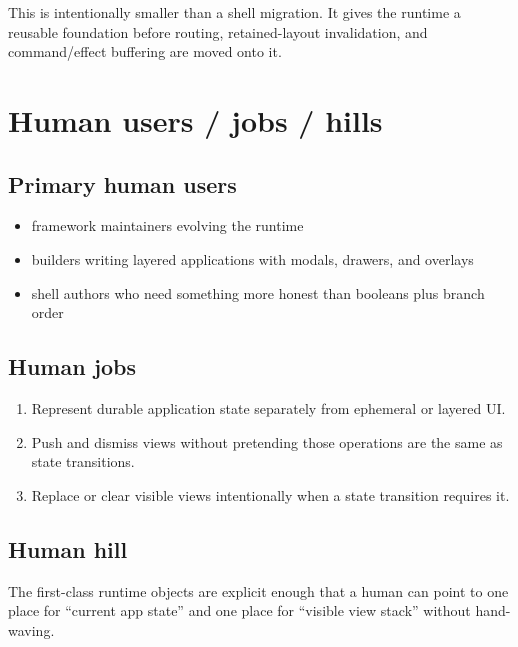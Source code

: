 This is intentionally smaller than a shell migration. It gives the runtime a reusable foundation before routing, retained-layout invalidation, and command/effect buffering are moved onto it.

\section{Human users / jobs / hills}\label{record-150-human-users-jobs-hills}

\subsection{Primary human users}\label{record-150-primary-human-users}

\begin{itemize}
\tightlist
\item
  framework maintainers evolving the runtime
\item
  builders writing layered applications with modals, drawers, and overlays
\item
  shell authors who need something more honest than booleans plus branch order
\end{itemize}

\subsection{Human jobs}\label{record-150-human-jobs}

\begin{enumerate}
\def\labelenumi{\arabic{enumi}.}
\tightlist
\item
  Represent durable application state separately from ephemeral or layered UI.
\item
  Push and dismiss views without pretending those operations are the same as state transitions.
\item
  Replace or clear visible views intentionally when a state transition requires it.
\end{enumerate}

\subsection{Human hill}\label{record-150-human-hill}

The first-class runtime objects are explicit enough that a human can point to one place for ``current app state'' and one place for ``visible view stack'' without hand-waving.

